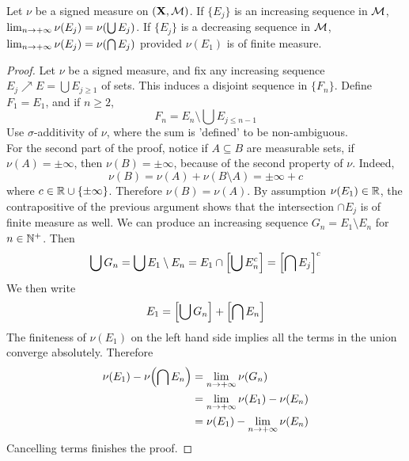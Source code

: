\documentclass[../../main.tex]{subfiles}
\begin{document}
\providecommand{\fn}{\{F_n\}}
\begin{wts}
    Let $\nu$ be a signed measure on $({\mathbf{X}},\mathcal{M})$. If $\{E_j\}$ is an increasing sequence in $\mathcal{M}$, $\lim_{n\to +\infty}\nu(E_j)=\nu\qty(\bigcup E_j)$. If $\{E_j\}$ is a decreasing sequence in $\mathcal{M}$, $\lim_{n\to +\infty}\nu(E_j)=\nu\qty(\bigcap E_j)$ provided $\nu(E_1)$ is of finite measure.
\end{wts}
\begin{proof}
    Let $\nu$ be a signed measure, and fix any increasing sequence $E_j\nearrow E=\bigcup E_{j\geq 1}$ of sets. This induces a disjoint sequence in $\{F_n\}$. Define $F_1 = E_1$, and if $n\geq 2$,
    \[F_n = E_n\setminus\bigcup E_{j\leq n-1}\]
    Use $\sigma$-additivity of $\nu$, where the sum is 'defined' to be non-ambiguous.\\

    For the second part of the proof, notice if $A\subseteq B$ are measurable sets, if $\nu(A)=\pm\infty$, then $\nu(B)=\pm\infty$, because of the second property of $\nu$. Indeed,
    \[
        \nu(B) = \nu(A)+\nu(B\setminus A) = \pm\infty+ c
    \]
    where $c\in\mathbb{R}\cup\{\pm\infty\}$. Therefore $\nu(B)=\nu(A)$. By assumption $\nu(E_1)\in\mathbb{R}$, the contrapositive of the previous argument shows that the intersection $\cap E_j$ is of finite measure as well. We can produce an increasing sequence $G_n = E_1\setminus E_n$ for $n\in\mathbb{N}^+$. Then
    \[
        \bigcup G_n = \bigcup E_1\setminus E_n = E_1\cap\qty[\bigcup E_n^c]=\qty[\bigcap E_j]^c
    \]
    We then write
    \[
        E_1 = \qty[\bigcup G_n] + \qty[\bigcap E_n]
    \]
    The finiteness of $\nu(E_1)$ on the left hand side implies all the terms in the union converge absolutely. Therefore
    \begin{align*}
            \nu(E_1) - \nu\qty(\bigcap E_n) &= \lim_{n\to+\infty} \nu(G_n)    \\
            &= \lim_{n\to+\infty}\nu(E_1) - \nu(E_n)\\
            &= \nu(E_1) - \lim_{n\to+\infty}\nu(E_n)
    \end{align*}
    Cancelling terms finishes the proof.
\end{proof}
\end{document}
